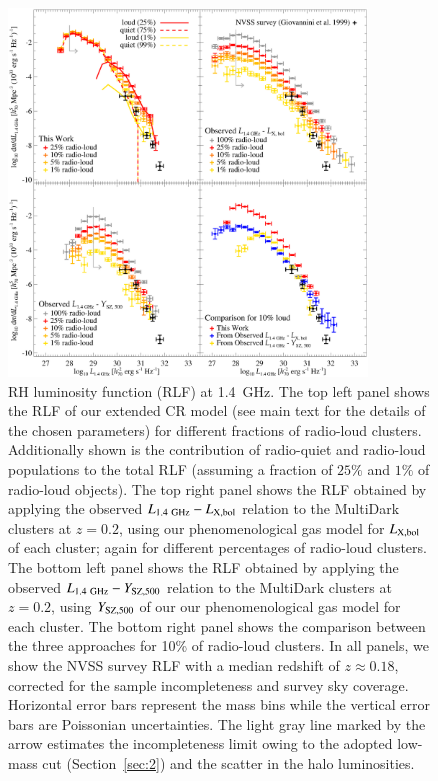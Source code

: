\documentclass[useAMS,usenatbib]{mn2e}
\begin{document}
\begin{figure} 
\centering
\includegraphics[width=0.85\textwidth]{figures/RLFs_1.4.eps}
\caption{RH luminosity function (RLF) at 1.4~GHz. The top left panel shows
  the RLF of our extended CR model (see main text for the details of the chosen
  parameters) for different fractions of radio-loud clusters. Additionally shown
  is the contribution of radio-quiet and radio-loud populations to the total RLF
  (assuming a fraction of $25\%$ and $1\%$ of radio-loud objects). The top right
  panel shows the RLF obtained by applying the observed
  $L_{1.4~{\mathrm{GHz}}}-L_{{\mathrm{X,bol}}}$ relation to the MultiDark clusters at $z =
  0.2$, using our phenomenological gas model for $L_{{\mathrm{X,bol}}}$ of each
  cluster; again for different percentages of radio-loud clusters.  The bottom
  left panel shows the RLF obtained by applying the observed
  $L_{1.4~{\mathrm{GHz}}}-Y_{{\mathrm{SZ}}, 500}$ relation to the MultiDark clusters at $z
  = 0.2$, using $Y_{{\mathrm{SZ}}, 500}$ of our our phenomenological gas model
  for each cluster. The bottom right panel shows the comparison between the
  three approaches for 10\% of radio-loud clusters. In all panels, we show the
  NVSS survey RLF \citep{1999NewA....4..141G} with a median redshift of 
  $z\approx 0.18$, corrected for the sample incompleteness and survey sky coverage. 
  Horizontal error bars represent the mass bins while the vertical error bars are Poissonian 
  uncertainties. The light gray line marked by the arrow estimates the incompleteness limit owing
  to the adopted low-mass cut (Section~\ref{sec:2}) and the scatter in the
  halo luminosities.}
\label{fig:RLF_1.4}
\end{figure}
\end{document}
